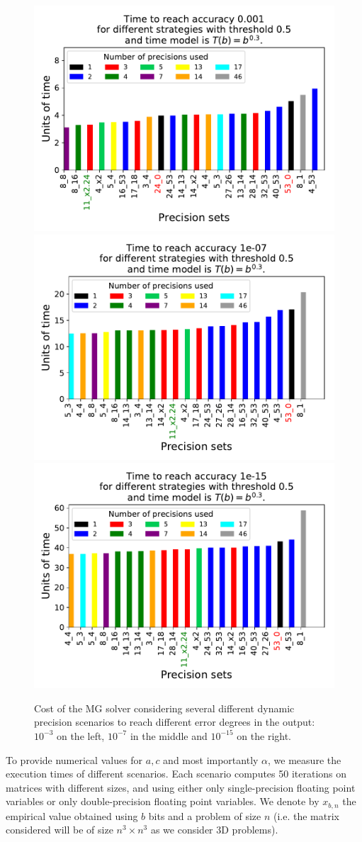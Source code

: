 \begin{figure}
    \includegraphics[width=0.33\linewidth]{figs/cost_3_2.pdf}
    \includegraphics[width=0.33\linewidth]{figs/cost_7_2.pdf}
    \includegraphics[width=0.33\linewidth]{figs/cost_15_2.pdf}
    \caption{Cost of the MG solver considering several different dynamic
    precision scenarios to reach different error degrees in the output:
    $10^{-3}$ on the left, $10^{-7}$ in the middle and $10^{-15}$ on the
    right.}
    \label{fig.estimation1}
\end{figure}

To provide numerical values for $a,c$ and most importantly $\alpha$, we measure
the execution times of different scenarios. Each scenario computes 50
iterations on matrices with different sizes, and using either only
single-precision floating point variables or only double-precision floating
point variables. We denote by $x_{b,n}$ the empirical value obtained using $b$
bits and a problem of size $n$ (i.e. the matrix considered will be of size $n^3
\times n^3$ as we consider 3D problems).



